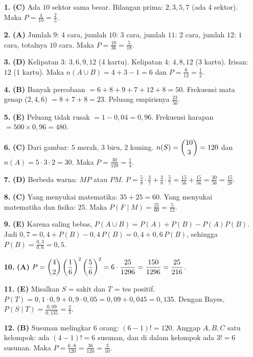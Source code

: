 \documentclass[a4paper,11pt]{article}
\newcommand{\dis}{\displaystyle}
\newcounter{no}
\begin{document}
\small\begin{enumerate}[leftmargin=2em,itemsep=2pt,topsep=2pt]
\item[\textbf{1.}] \textbf{(C)} Ada $10$ sektor sama besar. Bilangan prima: $2,3,5,7$ (ada $4$ sektor). Maka $P=\dis\frac4{10}=\dis\frac25$.
\item[\textbf{2.}] \textbf{(A)} Jumlah $9$: $4$ cara, jumlah $10$: $3$ cara, jumlah $11$: $2$ cara, jumlah $12$: $1$ cara, totalnya $10$ cara. Maka $P=\dis\frac{10}{36}=\dis\frac5{18}$.
\item[\textbf{3.}] \textbf{(D)} Kelipatan $3$: $3,6,9,12$ (4 kartu). Kelipatan $4$: $4,8,12$ (3 kartu). Irisan: $12$ (1 kartu). Maka $n(A\cup B)=4+3-1=6$ dan $P=\dis\frac6{12}=\dis\frac12$.
\item[\textbf{4.}] \textbf{(B)} Banyak percobaan $=6+8+9+7+12+8=50$. Frekuensi mata genap ($2,4,6$) $=8+7+8=23$. Peluang empirisnya $\dis\frac{23}{50}$.
\item[\textbf{5.}] \textbf{(E)} Peluang tidak rusak $=1-0{,}04=0{,}96$. Frekuensi harapan $=500\times0{,}96=480$.
\item[\textbf{6.}] \textbf{(C)} Dari gambar: $5$ merah, $3$ biru, $2$ kuning. $n(S)=\dbinom{10}{3}=120$ dan $n(A)=5\cdot3\cdot2=30$. Maka $P=\dis\frac{30}{120}=\dis\frac14$.
\item[\textbf{7.}] \textbf{(D)} Berbeda warna: $MP$ atau $PM$. $P=\dis\frac58\cdot\dis\frac37+\dis\frac38\cdot\dis\frac57=\dis\frac{15}{56}+\dis\frac{15}{56}=\dis\frac{30}{56}=\dis\frac{15}{28}$.
\item[\textbf{8.}] \textbf{(C)} Yang menyukai matematika: $35+25=60$. Yang menyukai matematika dan fisika: $25$. Maka $P(F\mid M)=\dis\frac{25}{60}=\dis\frac5{12}$.
\item[\textbf{9.}] \textbf{(E)} Karena saling bebas, $P(A\cup B)=P(A)+P(B)-P(A)P(B)$. Jadi $0{,}7=0{,}4+P(B)-0{,}4\,P(B)=0{,}4+0{,}6\,P(B)$, sehingga $P(B)=\dis\frac{0{,}3}{0{,}6}=0{,}5$.
\item[\textbf{10.}] \textbf{(A)} $P=\dbinom42\left(\dis\frac16\right)^{2}\left(\dis\frac56\right)^{2}=6\cdot\dis\frac{25}{1296}=\dis\frac{150}{1296}=\dis\frac{25}{216}$.
\item[\textbf{11.}] \textbf{(E)} Misalkan $S$ = sakit dan $T$ = tes positif. $P(T)=0{,}1\cdot0{,}9+0{,}9\cdot0{,}05=0{,}09+0{,}045=0{,}135$. Dengan Bayes, $P(S\mid T)=\dis\frac{0{,}09}{0{,}135}=\dis\frac23$.
\item[\textbf{12.}] \textbf{(B)} Susunan melingkar $6$ orang: $(6-1)!=120$. Anggap $A,B,C$ satu kelompok: ada $(4-1)!=6$ susunan, dan di dalam kelompok ada $3!=6$ susunan. Maka $P=\dis\frac{6\cdot6}{120}=\dis\frac{36}{120}=\dis\frac3{10}$.

\end{enumerate}
\end{document}
